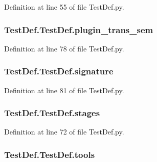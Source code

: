 Definition at line 55 of file Test\-Def.\-py.

\hypertarget{class_test_def_1_1_test_def_ac4a745e8b2151d1eed56e04770562eb9}{
\subsubsection[{plugin\-\_\-trans\-\_\-sem}]{\setlength{\rightskip}{0pt plus 5cm}Test\-Def.\-Test\-Def.\-plugin\-\_\-trans\-\_\-sem}}\label{class_test_def_1_1_test_def_ac4a745e8b2151d1eed56e04770562eb9}


Definition at line 78 of file Test\-Def.\-py.

\hypertarget{class_test_def_1_1_test_def_ab171a6f327589b31859a5b67a42dd21a}{
\subsubsection[{signature}]{\setlength{\rightskip}{0pt plus 5cm}Test\-Def.\-Test\-Def.\-signature}}\label{class_test_def_1_1_test_def_ab171a6f327589b31859a5b67a42dd21a}


Definition at line 81 of file Test\-Def.\-py.

\hypertarget{class_test_def_1_1_test_def_a9e15c13bd0cc9b1567c94f847118432e}{
\subsubsection[{stages}]{\setlength{\rightskip}{0pt plus 5cm}Test\-Def.\-Test\-Def.\-stages}}\label{class_test_def_1_1_test_def_a9e15c13bd0cc9b1567c94f847118432e}


Definition at line 72 of file Test\-Def.\-py.

\hypertarget{class_test_def_1_1_test_def_a2414cc1583555b0c758e0f9f0952a787}{
\subsubsection[{tools}]{\setlength{\rightskip}{0pt plus 5cm}Test\-Def.\-Test\-Def.\-tools}}\label{class_test_def_1_1_test_def_a2414cc1583555b0c758e0f9f0952a787}


